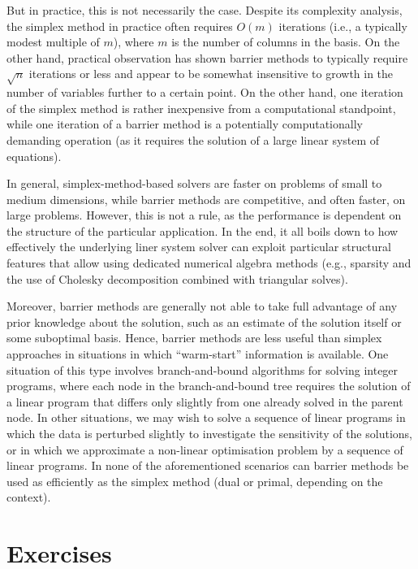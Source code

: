 But in practice, this is not necessarily the case. Despite its complexity analysis, the simplex method in practice often requires $O(m)$ iterations (i.e., a typically modest multiple of $m$), where $m$ is the number of columns in the basis. On the other hand, practical observation has shown barrier methods to typically require $\sqrt{n}$ iterations or less and appear to be somewhat insensitive to growth in the number of variables further to a certain point. On the other hand, one iteration of the simplex method is rather inexpensive from a computational standpoint, while one iteration of a barrier method is a potentially computationally demanding operation (as it requires the solution of a large linear system of equations).

In general, simplex-method-based solvers are faster on problems of small to medium dimensions, while barrier methods are competitive, and often faster, on large problems. However, this is not a rule, as the performance is dependent on the structure of the particular application. In the end, it all boils down to how effectively the underlying liner system solver can exploit particular structural features that allow using dedicated numerical algebra methods (e.g., sparsity and the use of Cholesky decomposition combined with triangular solves).

Moreover, barrier methods are generally not able to take full advantage of any prior knowledge about the solution, such as an estimate of the solution itself or some suboptimal basis. Hence, barrier methods are less useful than simplex approaches in situations in which ``warm-start'' information is available. One situation of this type involves branch-and-bound algorithms for solving integer programs, where each node in the branch-and-bound tree requires the solution of a linear program that differs only slightly from one already solved in the parent node. In other situations, we may wish to solve a sequence of linear programs in which the data is perturbed slightly to investigate the sensitivity of the solutions, or in which we approximate a non-linear optimisation problem by a sequence of linear programs. In none of the aforementioned scenarios can barrier methods be used as efficiently as the simplex method (dual or primal, depending on the context).

\vfill
\pagebreak	

\section{Exercises}


